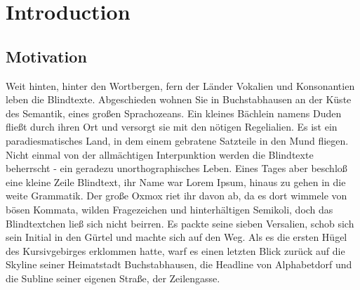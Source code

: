 \documentclass[12pt,a4paper,twoside]{scrartcl}
\numberwithin{equation}{section}
\begin{document}
\tableofcontents

\clearpage


\listoffigures
\listoftables
\listofalgorithms

\clearpage

\pagestyle{normal}

\section{Introduction}

\subsection{Motivation}

Weit hinten, hinter den Wortbergen, fern der Länder Vokalien und Konsonantien leben die Blindtexte. Abgeschieden wohnen Sie in Buchstabhausen an der Küste des Semantik, eines großen Sprachozeans. Ein kleines Bächlein namens Duden fließt durch ihren Ort und versorgt sie mit den nötigen Regelialien. Es ist ein paradiesmatisches Land, in dem einem gebratene Satzteile in den Mund fliegen. Nicht einmal von der allmächtigen Interpunktion werden die Blindtexte beherrscht - ein geradezu unorthographisches Leben. Eines Tages aber beschloß eine kleine Zeile Blindtext, ihr Name war Lorem Ipsum, hinaus zu gehen in die weite Grammatik. Der große Oxmox riet ihr davon ab, da es dort wimmele von bösen Kommata, wilden Fragezeichen und hinterhältigen Semikoli, doch das Blindtextchen ließ sich nicht beirren. Es packte seine sieben Versalien, schob sich sein Initial in den Gürtel und machte sich auf den Weg. Als es die ersten Hügel des Kursivgebirges erklommen hatte, warf es einen letzten Blick zurück auf die Skyline seiner Heimatstadt Buchstabhausen, die Headline von Alphabetdorf und die Subline seiner eigenen Straße, der Zeilengasse.
\end{document}
